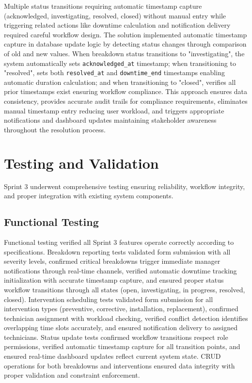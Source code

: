 Multiple status transitions requiring automatic timestamp capture (acknowledged, investigating, resolved, closed) without manual entry while triggering related actions like downtime calculation and notification delivery required careful workflow design. The solution implemented automatic timestamp capture in database update logic by detecting status changes through comparison of old and new values. When breakdown status transitions to "investigating", the system automatically sets \texttt{acknowledged\_at} timestamp; when transitioning to "resolved", sets both \texttt{resolved\_at} and \texttt{downtime\_end} timestamps enabling automatic duration calculation; and when transitioning to "closed", verifies all prior timestamps exist ensuring workflow compliance. This approach ensures data consistency, provides accurate audit trails for compliance requirements, eliminates manual timestamp entry reducing user workload, and triggers appropriate notifications and dashboard updates maintaining stakeholder awareness throughout the resolution process.

\section{Testing and Validation}

Sprint 3 underwent comprehensive testing ensuring reliability, workflow integrity, and proper integration with existing system components.

\subsection{Functional Testing}

Functional testing verified all Sprint 3 features operate correctly according to specifications. Breakdown reporting tests validated form submission with all severity levels, confirmed critical breakdowns trigger immediate manager notifications through real-time channels, verified automatic downtime tracking initialization with accurate timestamp capture, and ensured proper status workflow transitions through all states (open, investigating, in progress, resolved, closed). Intervention scheduling tests validated form submission for all intervention types (preventive, corrective, installation, replacement), confirmed technician assignment with workload checking, verified conflict detection identifies overlapping time slots accurately, and ensured notification delivery to assigned technicians. Status update tests confirmed workflow transitions respect role permissions, verified automatic timestamp capture for all transition points, and ensured real-time dashboard updates reflect current system state. CRUD operations for both breakdowns and interventions ensured data integrity with proper validation and constraint enforcement.

